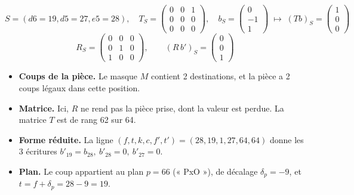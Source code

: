 \[ S = (d6=19, d5=27, e5=28),\quad T_S = \begin{pmatrix}0 & 0 & 1 \\ 0 & 0 & 0 \\ 0 & 0 & 0\end{pmatrix},\quad b_S = \begin{pmatrix}0 \\ -1 \\ 1\end{pmatrix}\;\longmapsto\; (Tb)_S =\begin{pmatrix}1 \\ 0 \\ 0\end{pmatrix} \]
\[ R_S = \begin{pmatrix}0 & 0 & 0 \\ 0 & 1 & 0 \\ 1 & 0 & 0\end{pmatrix},\qquad (R\,b')_S = \begin{pmatrix}0 \\ 0 \\ 1\end{pmatrix} \]
\begin{itemize}
\item \textbf{Coups de la pièce.} Le masque $M$ contient 2 destinations, et la pièce a 2 coups légaux dans cette position.
\item \textbf{Matrice.} Ici, $R$ ne rend pas la pièce prise, dont la valeur est perdue. La matrice $T$ est de rang 62 sur 64.
\item \textbf{Forme réduite.} La ligne $(f, t, k, c, f', t') = (28, 19, 1, 27, 64, 64)$ donne les 3 écritures $b'_{19} = b_{28},\ b'_{28} = 0,\ b'_{27} = 0$.
\item \textbf{Plan.} Le coup appartient au plan $p = 66$ (« PxO »), de décalage $\delta_p = -9$, et $t = f + \delta_p = 28 -9 = 19$.
\end{itemize}
